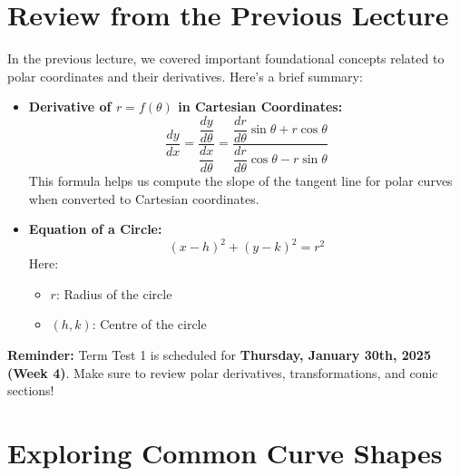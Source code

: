 \documentclass{article}
\begin{document}
\renewcommand{\familydefault}{\rmdefault}



\setcounter{page}{0}
\newpage
\tableofcontents
\newpage






\normalsize

\setcounter{page}{1}

\section*{Review from the Previous Lecture}
\begin{remarkbox}
In the previous lecture, we covered important foundational concepts related to polar coordinates and their derivatives. Here’s a brief summary: 

\begin{itemize}
    \item \textbf{Derivative of \( r = f(\theta) \) in Cartesian Coordinates:}
    \large
    \[
        \dfrac{dy}{dx} = \dfrac{\dfrac{dy}{d\theta}}{\dfrac{dx}{d\theta}} = \dfrac{\dfrac{dr}{d\theta}\sin\theta + r\cos\theta}{\dfrac{dr}{d\theta}\cos\theta - r\sin\theta}
    \]
    \normalsize
    This formula helps us compute the slope of the tangent line for polar curves when converted to Cartesian coordinates. 

    \item \textbf{Equation of a Circle:}
    \[
        (x-h)^2 + (y-k)^2 = r^2
    \]
    Here:
    \begin{itemize}
        \item[\labelitemi] \( r \): Radius of the circle
        \item[\labelitemi] \( (h, k) \): Centre of the circle
    \end{itemize}
\end{itemize}

\begin{notebox}
\textbf{Reminder:} Term Test 1 is scheduled for \textbf{Thursday, January 30th, 2025 (Week 4)}. Make sure to review polar derivatives, transformations, and conic sections!
\end{notebox}
\end{remarkbox}

\section*{Exploring Common Curve Shapes}
\end{document}
